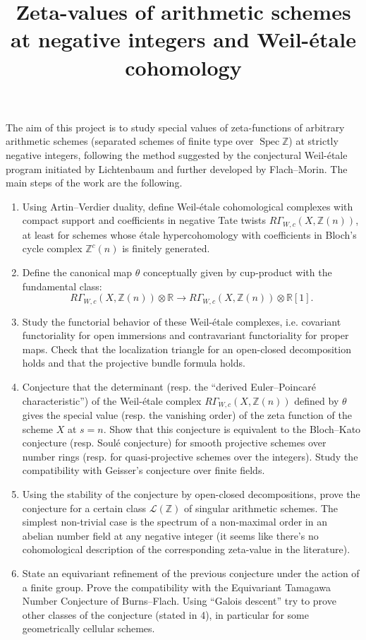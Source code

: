 \documentclass{article}
\title{Zeta-values of arithmetic schemes at negative integers and Weil-étale cohomology}
\date{}
\begin{document}
\maketitle
\thispagestyle{empty}

The aim of this project is to study special values of zeta-functions of
arbitrary arithmetic schemes (separated schemes of finite type over
$\operatorname{Spec} \mathbb{Z}$) at strictly negative integers, following the
method suggested by the conjectural Weil-étale program initiated by
Lichtenbaum and further developed by Flach--Morin. The main steps of the work
are the following.

\begin{enumerate}
\item Using Artin--Verdier duality, define Weil-étale cohomological complexes
  with compact support and coefficients in negative Tate twists
  $R\Gamma_{W,c} (X, \mathbb{Z} (n))$, at least for schemes whose étale
  hypercohomology with coefficients in Bloch's cycle complex $\mathbb{Z}^c (n)$
  is finitely generated.

\item Define the canonical map $\theta$ conceptually given by cup-product with
  the fundamental class:
  \[ R\Gamma_{W,c} (X, \mathbb{Z} (n)) \otimes \mathbb{R} \to
    R\Gamma_{W,c} (X, \mathbb{Z} (n)) \otimes \mathbb{R}[1]. \]

\item Study the functorial behavior of these Weil-étale complexes,
  i.e. covariant functoriality for open immersions and contravariant
  functoriality for proper maps. Check that the localization triangle for an
  open-closed decomposition holds and that the projective bundle formula holds.

\item Conjecture that the determinant (resp. the ``derived Euler--Poincaré
  characteristic'') of the Weil-étale complex
  $R\Gamma_{W,c} (X, \mathbb{Z}(n))$ defined by $\theta$ gives the special value
  (resp. the vanishing order) of the zeta function of the scheme $X$ at
  $s=n$. Show that this conjecture is equivalent to the Bloch--Kato conjecture
  (resp. Soulé conjecture) for smooth projective schemes over number rings
  (resp. for quasi-projective schemes over the integers). Study the
  compatibility with Geisser's conjecture over finite fields.

\item Using the stability of the conjecture by open-closed decompositions, prove
  the conjecture for a certain class $\mathcal{L} (\mathbb{Z})$ of singular
  arithmetic schemes. The simplest non-trivial case is the spectrum of a
  non-maximal order in an abelian number field at any negative integer (it seems
  like there's no cohomological description of the corresponding zeta-value in
  the literature).

\item State an equivariant refinement of the previous conjecture under the
  action of a finite group. Prove the compatibility with the Equivariant
  Tamagawa Number Conjecture of Burns--Flach. Using ``Galois descent'' try to
  prove other classes of the conjecture (stated in 4), in particular for some
  geometrically cellular schemes.
\end{enumerate}
\end{document}

